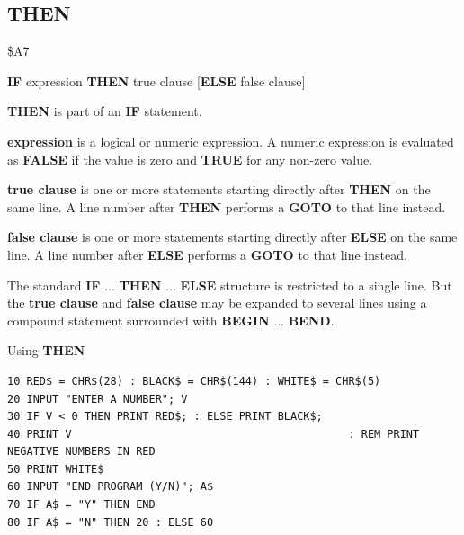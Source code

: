 
\newpage
\subsection{THEN}
\begin{description}[leftmargin=2cm,style=nextline]
\item [Token:]    \$A7

\item [Format:]   {\bf IF} expression {\bf THEN} true clause [{\bf ELSE} false clause]

\item [Usage:]    {\bf THEN} is part of an {\bf IF} statement.

                  {\bf expression} is a logical or numeric expression. A numeric expression is evaluated as {\bf FALSE} if the value is zero and {\bf TRUE} for any non-zero value.

                  {\bf true clause} is one or more statements starting directly after {\bf THEN} on the same line. A line number after {\bf THEN} performs a {\bf GOTO} to that line instead.

                  {\bf false clause} is one or more statements starting directly after {\bf ELSE} on the same line. A line number after {\bf ELSE} performs a {\bf GOTO} to that line instead.

\item [Remarks:]  The standard {\bf IF} ... {\bf THEN} ... {\bf ELSE} structure is restricted to a single line. But the {\bf true clause} and {\bf false clause} may be expanded to several lines using a compound statement surrounded with {\bf BEGIN} ... {\bf BEND}.

\item [Example:]  Using {\bf THEN}

\begin{tcolorbox}[colback=black,coltext=white]
\verbatimfont{\codefont}
\begin{verbatim}
10 RED$ = CHR$(28) : BLACK$ = CHR$(144) : WHITE$ = CHR$(5)
20 INPUT "ENTER A NUMBER"; V
30 IF V < 0 THEN PRINT RED$; : ELSE PRINT BLACK$;
40 PRINT V                                           : REM PRINT NEGATIVE NUMBERS IN RED
50 PRINT WHITE$
60 INPUT "END PROGRAM (Y/N)"; A$
70 IF A$ = "Y" THEN END
80 IF A$ = "N" THEN 20 : ELSE 60
\end{verbatim}
\end{tcolorbox}
\end{description}

